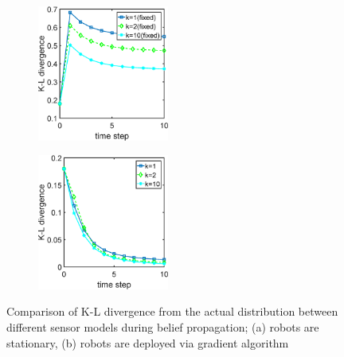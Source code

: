 \documentclass[journal]{IEEEtran}
\begin{document}
\begin{figure}
	\centering
	\begin{subfigure}[b]{0.23\textwidth}
		\centering
		\includegraphics[width=1.7in]{figure/kl_div_2}
		\caption{}
	\end{subfigure}
	\begin{subfigure}[b]{0.23\textwidth}
		\centering
		\includegraphics[width=1.7in]{figure/kl_div_1}
		\caption{}
	\end{subfigure}
	\caption{Comparison of K-L divergence from the actual distribution between different sensor models during belief propagation; (a) robots are stationary, (b) robots are deployed via gradient algorithm}
	\label{fig:fig5}
\end{figure}
\end{document}

